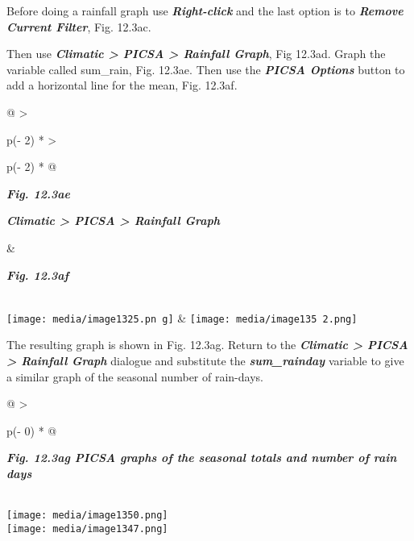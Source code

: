 \documentclass[
  letterpaper,
  DIV=11,
  numbers=noendperiod]{scrreprt}
\begin{document}
Before doing a rainfall graph use \textbf{\emph{Right-click}} and the
last option is to \textbf{\emph{Remove Current Filter}}, Fig. 12.3ac.

Then use \textbf{\emph{Climatic \textgreater{} PICSA \textgreater{}
Rainfall Graph}}, Fig 12.3ad. Graph the variable called sum\_rain, Fig.
12.3ae. Then use the \textbf{\emph{PICSA Options}} button to add a
horizontal line for the mean, Fig. 12.3af.

\begin{longtable}[]{@{}
  >{\raggedright\arraybackslash}p{(\columnwidth - 2\tabcolsep) * }
  >{\raggedright\arraybackslash}p{(\columnwidth - 2\tabcolsep) * }@{}}
\toprule\noalign{}
\begin{minipage}[b]{\linewidth}\raggedright
\textbf{\emph{Fig. 12.3ae}}

\textbf{\emph{Climatic \textgreater{} PICSA \textgreater{} Rainfall
Graph}}
\end{minipage} & \begin{minipage}[b]{\linewidth}\raggedright
\textbf{\emph{Fig. 12.3af}}
\end{minipage} \\
\midrule\noalign{}
\endhead
\bottomrule\noalign{}
\endlastfoot
\texttt{[image: media/image1325.pn g]}
&
\texttt{[image: media/image135 2.png]} \\
\end{longtable}

The resulting graph is shown in Fig. 12.3ag. Return to the
\textbf{\emph{Climatic \textgreater{} PICSA \textgreater{} Rainfall
Graph}} dialogue and substitute the \textbf{\emph{sum\_rainday}}
variable to give a similar graph of the seasonal number of rain-days.

\begin{longtable}[]{@{}
  >{\raggedright\arraybackslash}p{(\columnwidth - 0\tabcolsep) * }@{}}
\toprule\noalign{}
\begin{minipage}[b]{\linewidth}\raggedright
\textbf{\emph{Fig. 12.3ag PICSA graphs of the seasonal totals and number
of rain days}}
\end{minipage} \\
\midrule\noalign{}
\endhead
\bottomrule\noalign{}
\endlastfoot
\texttt{[image: media/image1350.png]} \\
\texttt{[image: media/image1347.png]} \\
\end{longtable}
\end{document}
